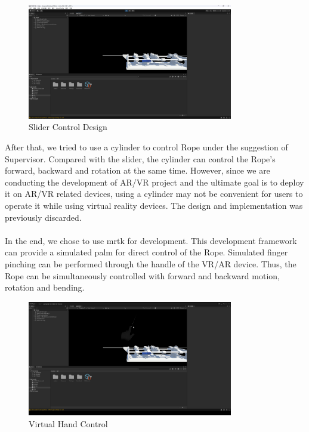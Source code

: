 \documentclass[12pt]{article}
\begin{document}
\begin{enumerate}
      \begin{figure}[H]
            \centering
            \includegraphics[width=0.8\textwidth]{slider.png}
            \caption{Slider Control Design}
      \end{figure}
      After that, we tried to use a cylinder to control Rope under the suggestion of Supervisor. Compared with the slider, the cylinder can control the Rope's forward, backward and rotation at the same time. However, since we are conducting the development of AR/VR project and the ultimate goal is to deploy it on AR/VR related devices, using a cylinder may not be convenient for users to operate it while using virtual reality devices. The design and implementation was previously discarded.
      \\\\
      In the end, we chose to use \gls{mrtk} for development. This development framework can provide a simulated palm for direct control of the Rope. Simulated finger pinching can be performed through the handle of the VR/AR device. Thus, the Rope can be simultaneously controlled with forward and backward motion, rotation and bending.
      \begin{figure}[H]
            \centering
            \includegraphics[width=0.8\textwidth]{hand1.png}
            \caption{Virtual Hand Control}
      \end{figure}

\end{enumerate}
\end{document}
